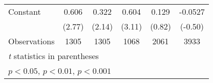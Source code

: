 {\begin{tabular}{l*{5}{c}}
\addlinespace
Constant                                &0.606\sym{**} &0.322\sym{*}  &0.604\sym{**} &0.129         &-0.0527         \\
                                        &(2.77)         &(2.14)         &(3.11)         &(0.82)         &(-0.50)         \\
\midrule
Observations                            & 1305         & 1305         & 1068         & 2061         & 3933         \\
\bottomrule
\multicolumn{6}{l}{\footnotesize \textit{t} statistics in parentheses}\\
\multicolumn{6}{l}{\footnotesize \sym{*} \(p<0.05\), \sym{**} \(p<0.01\), \sym{***} \(p<0.001\)}\\
\end{tabular}
}
